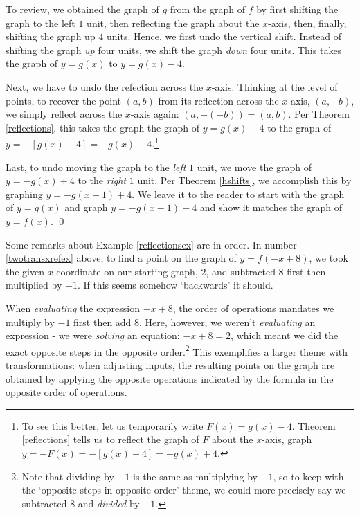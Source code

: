 \documentclass{ximera}
\begin{document}
\begin{example}
\begin{enumerate}
 \smallskip
 
 To review, we obtained the graph of $g$ from the graph of $f$ by first shifting the graph to the left $1$ unit, then reflecting the graph about the $x$-axis, then, finally, shifting the graph up $4$ units.  Hence, we first undo the vertical shift.  Instead of shifting the graph \textit{up} four units, we shift the graph \textit{down} four units.  This takes the graph of $y = g(x)$ to $y = g(x)-4$.  
 
 \smallskip
 
 Next, we have to undo the refection across the $x$-axis.  Thinking at the level of points, to recover the point $(a,b)$ from its reflection across the $x$-axis, $(a,-b)$, we simply reflect across the $x$-axis again: $(a,-(-b)) = (a,b)$.  Per Theorem \ref{reflections}, this takes the graph the graph of $y = g(x)-4$ to the graph of $y = -[g(x)-4] = -g(x) + 4$.\footnote{To see this better, let us temporarily write $F(x) = g(x)-4$.  Theorem \ref{reflections} tells us to reflect the graph of $F$ about the $x$-axis, graph $y=-F(x) = - [g(x)-4] = -g(x)+4$.} 
 
 \smallskip
 
 Last, to undo moving the graph to the \textit{left} $1$ unit, we move the graph of $y=-g(x)+4$ to the \textit{right} $1$ unit.  Per Theorem \ref{hshifts}, we accomplish this by graphing $y = -g(x-1)+4$.  We leave it to the reader to start with the graph of $y=g(x)$ and graph $y = -g(x-1)+4$ and show it matches the graph of $y=f(x)$. \qed
    
 \end{enumerate}

\end{example}

Some remarks about Example \ref{reflectionsex}  are in order. In number \ref{twotransxrefex} above, to find a point on the graph of $y=f(-x+8)$, we took the given $x$-coordinate on our starting graph, $2$, and subtracted $8$ first then multiplied by $-1$.  If this seems somehow `backwards' it should.  

\smallskip

When \textit{evaluating} the expression $-x+8$, the order of operations mandates we multiply by $-1$ first then add $8$.  Here, however, we weren't \textit{evaluating} an expression - we were \textit{solving} an equation:  $-x+8 = 2$, which meant we did the exact opposite steps in the opposite order.\footnote{Note that dividing by $-1$ is the same as multiplying by $-1$, so to keep with the `opposite steps in opposite order' theme, we could more precisely say we subtracted $8$ and \textit{divided} by $-1$.}  This exemplifies a larger theme with transformations:  when adjusting inputs, the resulting points on the graph are obtained by applying the opposite operations indicated by the formula in the opposite order of operations.
\end{document}
